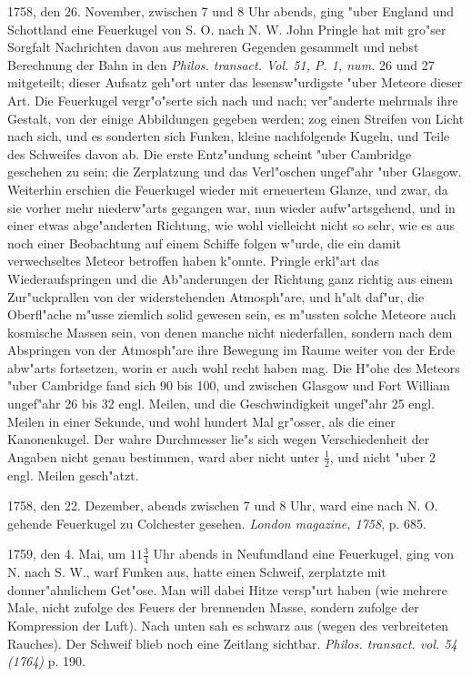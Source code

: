 \documentclass[a4paper, 11pt, oneside, polutonikogreek, german]{article}
\begin{document}
1758, den 26. November, zwischen 7 und 8 Uhr abends, ging "uber England und Schottland eine Feuerkugel von S. O. nach N. W. John Pringle hat mit gro"ser Sorgfalt Nachrichten davon aus mehreren Gegenden gesammelt und nebst Berechnung der Bahn in den \emph{Philos. transact. Vol. 51, P. 1, num.} 26 und 27 mitgeteilt; dieser Aufsatz geh"ort unter das lesensw"urdigste "uber Meteore dieser Art. Die Feuerkugel vergr"o"serte sich nach und nach; ver"anderte mehrmals ihre Gestalt, von der einige Abbildungen gegeben werden; zog einen Streifen von Licht nach sich, und es sonderten sich Funken, kleine nachfolgende Kugeln, und Teile des Schweifes davon ab. Die erste Entz"undung scheint "uber Cambridge geschehen zu sein; die Zerplatzung und das Verl"oschen ungef"ahr "uber Glasgow. Weiterhin erschien die Feuerkugel wieder mit erneuertem Glanze, und zwar, da sie vorher mehr niederw"arts gegangen war, nun wieder aufw"artsgehend, und in einer etwas abge"anderten Richtung, wie wohl vielleicht nicht so sehr, wie es aus noch einer Beobachtung auf einem Schiffe folgen w"urde, die ein damit verwechseltes Meteor betroffen haben k"onnte. Pringle erkl"art das Wiederaufspringen und die Ab"anderungen der Richtung ganz richtig aus einem Zur"uckprallen von der widerstehenden Atmosph"are, und h"alt daf"ur, die Oberfl"ache m"usse ziemlich solid gewesen sein, es m"ussten solche Meteore auch kosmische Massen sein, von denen manche nicht niederfallen, sondern nach dem Abspringen von der Atmosph"are ihre Bewegung im Raume weiter von der Erde abw"arts fortsetzen, worin er auch wohl recht haben mag. Die H"ohe des Meteors "uber Cambridge fand sich 90 bis 100, und zwischen Glasgow und Fort William ungef"ahr 26 bis 32 engl. Meilen, und die Geschwindigkeit ungef"ahr 25 engl. Meilen in einer Sekunde, und wohl hundert Mal gr"osser, als die einer Kanonenkugel. Der wahre Durchmesser lie"s sich wegen Verschiedenheit der Angaben nicht genau bestimmen, ward aber nicht unter $\mathfrak{\frac{1}{2}}$, und nicht "uber 2 engl. Meilen gesch"atzt.

1758, den 22. Dezember, abends zwischen 7 und 8 Uhr, ward eine nach N. O. gehende Feuerkugel zu Colchester gesehen. \emph{London magazine, 1758}, p. 685.

1759, den 4. Mai, um $\mathfrak{11\frac{3}{4}}$ Uhr abends in Neufundland eine Feuerkugel, ging von N. nach S. W., warf Funken aus, hatte einen Schweif, zerplatzte mit donner"ahnlichem Get"ose. Man will dabei Hitze versp"urt haben (wie mehrere Male, nicht zufolge des Feuers der brennenden Masse, sondern zufolge der Kompression der Luft). Nach unten sah es schwarz aus (wegen des verbreiteten Rauches). Der Schweif blieb noch eine Zeitlang sichtbar. \emph{Philos. transact. vol. 54 (1764)} p. 190.
\end{document}
